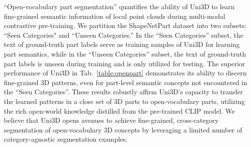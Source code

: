 \documentclass{article} \usepackage{iclr2024_conference,times}
\def\Ours{Uni3D\xspace}
\begin{document}
\begin{table*}[t]
\setlength{\tabcolsep}{1.5pt}
\centering
   \caption{Open-vocabulary segmentation results on the ShapeNetPart dataset. }
\vspace{0.2cm}
   
   \label{table:openpart}
\end{table*}




   
``Open-vocabulary part segmentation'' quantifies the ability of \Ours to learn fine-grained semantic information of local point clouds during multi-modal contrastive pre-training. We partition the ShapeNetPart dataset into two subsets: ``Seen Categories" and ``Unseen Categories.'' In the ``Seen Categories'' subset, the text of ground-truth part labels serve as training samples of \Ours for learning part semantics, while in the ``Unseen Categories'' subset, the text of ground-truth part labels is unseen during training and is only utilized for testing. The superior performance of \Ours in Tab.~\ref{table:openpart} demonstrates its ability to discern fine-grained 3D patterns, even for part-level semantic concepts not encountered in the ``Seen Categories''. These results robustly affirm \Ours's capacity to transfer the learned patterns in a close set of 3D parts to open-vocabulary parts, utilizing the rich open-world knowledge distilled from the pre-trained CLIP model. We believe that \Ours opens avenues to achieve fine-grained, cross-category segmentation of open-vocabulary 3D concepts by leveraging a limited number of category-agnostic segmentation examples.
\end{document}
